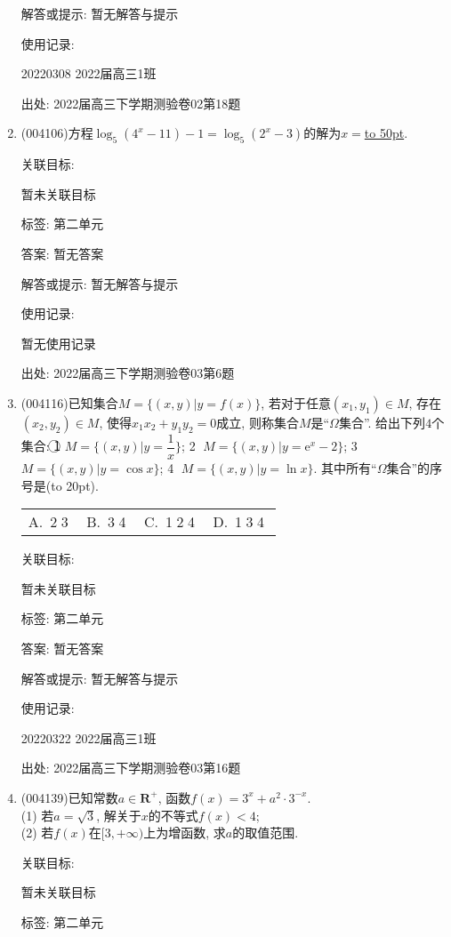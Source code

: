 \documentclass[10pt,a4paper]{article}
\newcommand{\blank}[1]{\underline{\hbox to #1pt{}}}
\newcommand{\bracket}[1]{(\hbox to #1pt{})}
\newcommand{\fourch}[4]{\par\begin{tabular}{p{.23\textwidth}p{.23\textwidth}p{.23\textwidth}p{.23\textwidth}}
A.~#1 &B.~#2& C.~#3& D.~#4
\end{tabular}}
\begin{document}
\begin{enumerate}[1.]
解答或提示: 暂无解答与提示

使用记录:

20220308	2022届高三1班		


出处: 2022届高三下学期测验卷02第18题
\item { (004106)}方程$\log_5(4^x-11)-1=\log_5(2^x-3)$的解为$x=$\blank{50}.


关联目标:

暂未关联目标



标签: 第二单元

答案: 暂无答案

解答或提示: 暂无解答与提示

使用记录:

暂无使用记录


出处: 2022届高三下学期测验卷03第6题
\item { (004116)}已知集合$M=\{(x,y)|y=f(x)\}$, 若对于任意$(x_1,y_1)\in M$, 存在$(x_2,y_2)\in M$, 使得$x_1x_2+y_1y_2=0$成立, 则称集合$M$是``$\Omega$集合''. 给出下列$4$个集合:
\textcircled{1} $M=\{(x,y) |y=\dfrac 1x \}$; \textcircled{2} $M=\{(x,y)|y=\mathrm{e}^x-2\}$; \textcircled{3} $M=\{(x,y)|y=\cos x\}$; \textcircled{4} $M=\{(x,y)|y=\ln x\}$.
其中所有``$\Omega$集合''的序号是\bracket{20}.
\fourch{\textcircled{2}\textcircled{3}}{\textcircled{3}\textcircled{4}}{\textcircled{1}\textcircled{2}\textcircled{4}}{\textcircled{1}\textcircled{3}\textcircled{4}}


关联目标:

暂未关联目标



标签: 第二单元

答案: 暂无答案

解答或提示: 暂无解答与提示

使用记录:

20220322	2022届高三1班	


出处: 2022届高三下学期测验卷03第16题
\item { (004139)}已知常数$a\in \mathbf{R}^+$, 函数$f(x)=3^x+a^2\cdot 3^{-x}$.\\
(1) 若$a=\sqrt{3}$, 解关于$x$的不等式$f(x)<4$;\\
(2) 若$f(x)$在$[3,+\infty)$上为增函数, 求$a$的取值范围.


关联目标:

暂未关联目标



标签: 第二单元


\end{enumerate}
\end{document}
